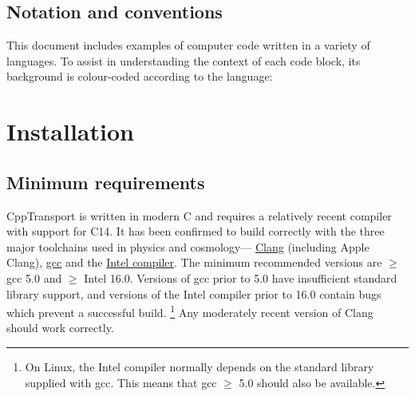 \documentclass[11pt,a4paper]{article}
\newcommand{\packagefont}{\sffamily}
\newcommand{\CppTransport}{{\packagefont CppTransport}}
\newcommand{\CMake}{{\packagefont CMake}}
\newcommand{\semibold}[1]{{\fontseries{b}\selectfont{#1}}}
\newcommand{\para}[1]{\par\vspace{2mm}\noindent\semibold{{#1.}---}\ignorespaces}
\newcommand\CC{C\nolinebreak\hspace{-.05em}\raisebox{.4ex}{\relsize{-3}{\textbf{+}}}\nolinebreak\hspace{-.10em}\raisebox{.4ex}{\relsize{-3}{\textbf{+}}}}
\renewcommand{\geq}{\geqslant}
\begin{document}
\subsection{Notation and conventions}
This document includes examples of computer code written in a variety
of languages.
To assist in understanding the context of each code block, its background
is colour-coded according to the language:

\section{Installation}

\subsection{Minimum requirements}

\para{Compiler}
{\CppTransport} is written in modern {\CC} and requires a relatively recent compiler
with support for {\CC}14.
It has been confirmed to build
correctly with the three major toolchains used in physics and cosmology---%
\href{http://clang.llvm.org}{Clang}
(including Apple Clang),
\href{https://gcc.gnu.org}{gcc} and the
\href{https://software.intel.com/en-us/c-compilers}{Intel compiler}.
The minimum recommended versions
are $\geq$ gcc 5.0
and $\geq$ Intel 16.0.
Versions of gcc prior to 5.0 have insufficient standard library support,
and versions of the Intel compiler prior to 16.0
contain bugs which prevent a successful build.%
    \footnote{On Linux, the Intel compiler normally depends on the
    standard library supplied with gcc.
    This means that gcc $\geq$ 5.0 should also be available.}
Any moderately recent version of Clang should work correctly.
\end{document}
